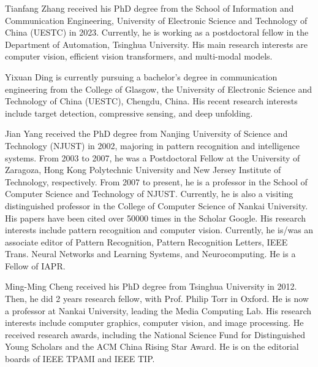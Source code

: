 \documentclass[10pt,journal,compsoc]{IEEEtran}
\begin{document}
\begin{IEEEbiography}
{Tianfang Zhang}
received his PhD degree from the School of Information and Communication Engineering, University of Electronic Science and Technology of China (UESTC) in 2023. Currently, he is working as a postdoctoral fellow in the Department of Automation, Tsinghua University. His main research interests are computer vision, efficient vision transformers, and multi-modal models.
\end{IEEEbiography}

\begin{IEEEbiography}
{Yixuan Ding}
is currently pursuing a bachelor’s degree in communication engineering from the College of Glasgow, the University of Electronic Science and Technology of China (UESTC), Chengdu, China. His recent research interests include target detection, compressive sensing, and deep unfolding. 

\end{IEEEbiography}

\begin{IEEEbiography}
{Jian Yang} received the PhD degree from Nanjing University of Science and Technology (NJUST) in 2002, majoring in pattern recognition and intelligence systems. From 2003 to 2007, he was a Postdoctoral Fellow at the University of Zaragoza, Hong Kong Polytechnic University and New Jersey Institute of Technology, respectively. From 2007 to present, he is a professor in the School of Computer Science and Technology of NJUST. Currently, he is also a visiting distinguished professor in the College of Computer Science of Nankai University. His papers have been cited over 50000 times in the Scholar Google. His research interests include pattern recognition and computer vision. Currently, he is/was an associate editor of Pattern Recognition, Pattern Recognition Letters, IEEE Trans. Neural Networks and Learning Systems, and Neurocomputing. He is a Fellow of IAPR. 
\end{IEEEbiography}

\begin{IEEEbiography}
{Ming-Ming Cheng} received his PhD degree from Tsinghua University in 2012.
Then, he did 2 years research fellow, with Prof. Philip Torr in Oxford.
He is now a professor at Nankai University, leading the Media Computing Lab.
His research interests include computer graphics, computer vision, and image processing. 
He received research awards, including the National Science Fund for Distinguished Young Scholars and the ACM China Rising Star Award.
He is on the editorial boards of IEEE TPAMI and IEEE TIP.
\end{IEEEbiography}
\end{document}
